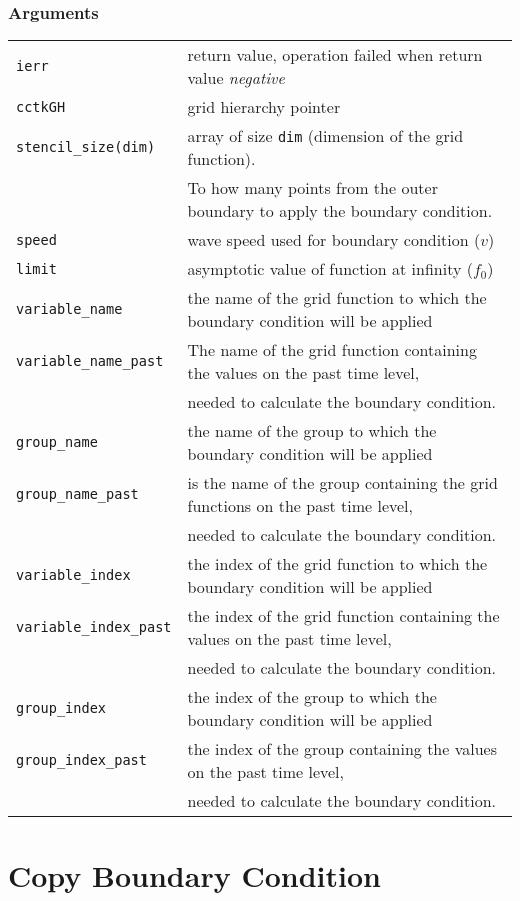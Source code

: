 \documentclass{article}
\begin{document}
\subsubsection*{Arguments}
\begin{tabular}{ll}
{\tt ierr} & return value, operation failed when return
value {\em negative}\\
{\tt cctkGH} & grid hierarchy pointer\\
{\tt stencil\_size(dim)} & array of size {\tt dim}
(dimension of the grid function).\\
& To how many points from the outer boundary to apply the boundary condition. \\
{\tt speed} & wave speed used for boundary condition ($v$)\\
{\tt limit} & asymptotic value of function at infinity ($f_0$)\\
{\tt variable\_name} & the name of the grid function
	to which the boundary condition will be applied\\
{\tt variable\_name\_past} & The name of the grid function containing the values on the past time level,\\
& needed to calculate the boundary condition.\\
{\tt group\_name} & the name of the group to which the boundary condition will be applied\\
{\tt group\_name\_past} & is the name of the group containing the grid functions on the past time level,\\
& needed to calculate the boundary condition.\\
{\tt variable\_index} & the index of the grid function to which the boundary condition will be applied\\
{\tt variable\_index\_past} & the index of the grid function containing the values on the past time level,\\
& needed to calculate the boundary condition.\\
{\tt group\_index} & the index of the group to which the boundary condition will be applied\\
{\tt group\_index\_past} & the index of the group containing the values on the past time level,\\
& needed to calculate the boundary condition.\\
\end{tabular}


\section{Copy Boundary Condition}
\end{document}
